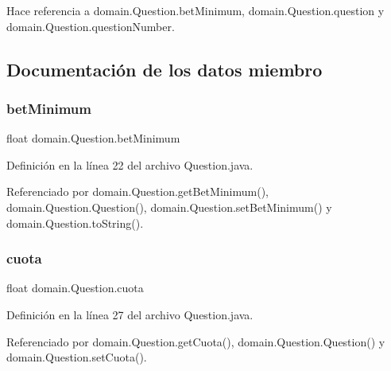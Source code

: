 Hace referencia a domain.\+Question.\+bet\+Minimum, domain.\+Question.\+question y domain.\+Question.\+question\+Number.



\subsection{Documentación de los datos miembro}
\mbox{\label{classdomain_1_1Question_a24ff305bdbaca1ac5ea5263f8f9be7d2}} 
\subsubsection{\texorpdfstring{betMinimum}{betMinimum}}
{\footnotesize\ttfamily float domain.\+Question.\+bet\+Minimum\hspace{0.3cm}{\ttfamily [private]}}



Definición en la línea 22 del archivo Question.\+java.



Referenciado por domain.\+Question.\+get\+Bet\+Minimum(), domain.\+Question.\+Question(), domain.\+Question.\+set\+Bet\+Minimum() y domain.\+Question.\+to\+String().

\mbox{\label{classdomain_1_1Question_a532249286ab9f5f211a030892bcd6756}} 
\subsubsection{\texorpdfstring{cuota}{cuota}}
{\footnotesize\ttfamily float domain.\+Question.\+cuota\hspace{0.3cm}{\ttfamily [private]}}



Definición en la línea 27 del archivo Question.\+java.



Referenciado por domain.\+Question.\+get\+Cuota(), domain.\+Question.\+Question() y domain.\+Question.\+set\+Cuota().

\mbox{\label{classdomain_1_1Question_a375d8735a06d8a8b12fe643bb31f4c14}} 
